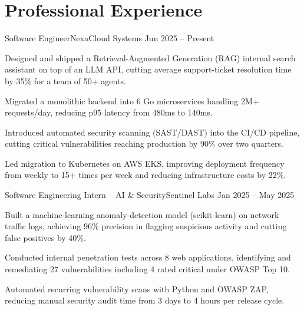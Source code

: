 \section{\textbf{Professional Experience}}
    \resumeSubHeadingListStart

    \resumeEntry
        {Software Engineer}{NexaCloud Systems}
        {}{Jun 2025 -- Present}
        \vspace{-2.0mm}
        \resumeItemListStart
            \item {Designed and shipped a Retrieval-Augmented Generation (RAG) internal search assistant on top of an LLM API, cutting average support-ticket resolution time by 35\% for a team of 50+ agents.}
            \item {Migrated a monolithic backend into 6 Go microservices handling 2M+ requests/day, reducing p95 latency from 480ms to 140ms.}
            \item {Introduced automated security scanning (SAST/DAST) into the CI/CD pipeline, cutting critical vulnerabilities reaching production by 90\% over two quarters.}
            \item {Led migration to Kubernetes on AWS EKS, improving deployment frequency from weekly to 15+ times per week and reducing infrastructure costs by 22\%.}
        \resumeItemListEnd
    \vspace{-3.0mm}

    \resumeEntry
        {Software Engineering Intern -- AI \& Security}{Sentinel Labs}
        {}{Jan 2025 -- May 2025}
        \vspace{-2.0mm}
        \resumeItemListStart
            \item {Built a machine-learning anomaly-detection model (scikit-learn) on network traffic logs, achieving 96\% precision in flagging suspicious activity and cutting false positives by 40\%.}
            \item {Conducted internal penetration tests across 8 web applications, identifying and remediating 27 vulnerabilities including 4 rated critical under OWASP Top 10.}
            \item {Automated recurring vulnerability scans with Python and OWASP ZAP, reducing manual security audit time from 3 days to 4 hours per release cycle.}
        \resumeItemListEnd
    \vspace{-3.0mm}

    \resumeSubHeadingListEnd
\vspace{-5.5mm}
